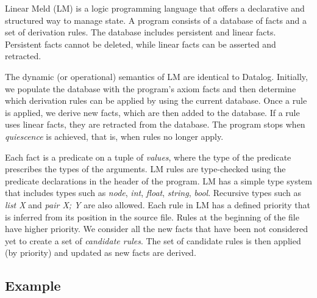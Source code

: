 \newcommand{\selector}[0]{[~S~\Rightarrow~y;~BE~] \lolli HE}
\newcommand{\comprehension}[0]{\{~\widehat{x};~BE;~SH~\}}
\newcommand{\aggregate}[0]{[~A~\Rightarrow~y;~\widehat{x};~BE;~SH_1;~SH_2~]}

Linear Meld (LM) is a logic programming language that offers a declarative and structured way to manage state.
A program consists of a database of facts and a set of derivation rules. The database includes persistent
and linear facts. Persistent facts cannot be deleted, while linear facts can be asserted and retracted.

The dynamic (or operational) semantics of LM are identical to Datalog.
Initially, we populate the database with the program's axiom facts and then determine which derivation rules can be applied by using the current database. Once a rule is applied, we derive new facts, which are then added to the database.
If a rule uses linear facts, they are retracted from the database.
The program stops when \emph{quiescence} is achieved, that is, when rules no longer apply.

Each fact is a predicate on a tuple of \emph{values}, where the type of the predicate prescribes the types of the arguments.
LM rules are type-checked using the predicate declarations in the header of the program. LM has a simple type system that includes types such as
\emph{node}, \emph{int}, \emph{float}, \emph{string}, \emph{bool}. Recursive types such as \emph{list X} and \emph{pair X; Y} are
also allowed.
Each rule in LM has a defined priority that is inferred from its position in the source file.
Rules at the beginning of the file have higher priority. We consider all
the new facts that have been not considered yet to create a set of \emph{candidate rules}.
The set of candidate rules is then applied (by priority) and updated as new facts are derived.

\subsection{Example}


